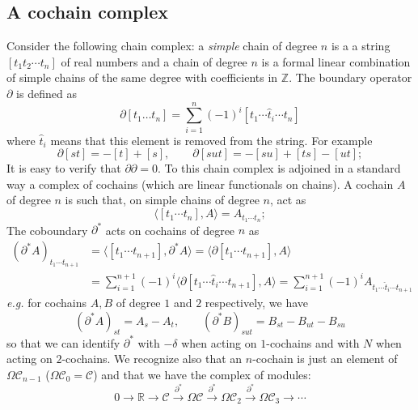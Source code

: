 \documentclass[a4paper,12pt,reqno]{amsproc}
\newcommand{\RR}{\mathbb{R}}
\newcommand{\NN}{N}
\newcommand{\CC}{\mathcal{C}}
\newcommand{\OCC}{\Omega \mathcal{C}}
\begin{document}
\subsection{A cochain complex}
Consider the following chain complex: a \emph{simple} chain of degree $n$ is a
a string 
$[t_1 t_2 \cdots t_n]$ of real numbers and a chain of degree $n$ is
a formal linear combination of simple chains of the same degree with
coefficients in $\mathbb{Z}$. The boundary operator $\partial$ is
defined as
\begin{equation}
  \label{eq:boundary}
 \partial[t_1 \dots t_n] = \sum_{i=1}^n (-1)^{i} [t_1 \cdots \hat t_i \cdots t_n]  
\end{equation}
where $\hat t_i$ means that this element is removed from the
string. For example
\begin{equation*}
  \partial[st] = -[t]+[s], \qquad \partial [sut] = -[su]+[ts]-[ut];
\end{equation*}
It is easy to verify that $\partial \partial = 0$. To this chain
complex is adjoined in a standard way a complex of cochains (which are
linear functionals on chains). A cochain $A$ of degree $n$ is such
that, on simple chains  of degree $n$, act as
\begin{equation*}
 \langle [t_1\cdots t_n],A\rangle = A_{t_1\cdots t_n};
\end{equation*}
The coboundary $\partial^*$ acts on cochains of degree $n$ as
\begin{equation}
  \label{eq:coboundary}
  \begin{split}
(\partial^* A)_{t_1\cdots t_{n+1}} & = \langle[t_1\cdots
t_{n+1}],\partial^* A \rangle = \langle \partial [t_1\cdots
t_{n+1}], A \rangle      
\\ & = \sum_{i=1}^{n+1} (-1)^i
 \langle \partial [t_1\cdots \hat t_i \cdots
t_{n+1}], A \rangle =   \sum_{i=1}^{n+1} (-1)^i A_{t_1\cdots \hat t_i \cdots
t_{n+1}}
  \end{split}
\end{equation}
\emph{e.g.} for cochains $A,B$ of degree $1$ and $2$ respectively, we have
\begin{equation*}
  (\partial^* A)_{st} = A_s - A_t, \qquad (\partial^* B)_{sut} = B_{st}-B_{ut}-B_{su}
\end{equation*}
so that we can identify $\partial^*$ with $-\delta$ when acting on
$1$-cochains and with $\NN$ when acting on $2$-cochains. We recognize
also that an $n$-cochain is just an element of $\OCC_{n-1}$ ($\OCC_0 =
\CC$) and that
we have the complex of modules:
\begin{equation*}
 0 \rightarrow \RR \rightarrow \CC \stackrel{\partial^*}{\longrightarrow} \OCC \stackrel{\partial^*}{\longrightarrow} \OCC_2 \stackrel{\partial^*}{\longrightarrow} \OCC_3 \rightarrow \cdots 
\end{equation*}
\end{document}
